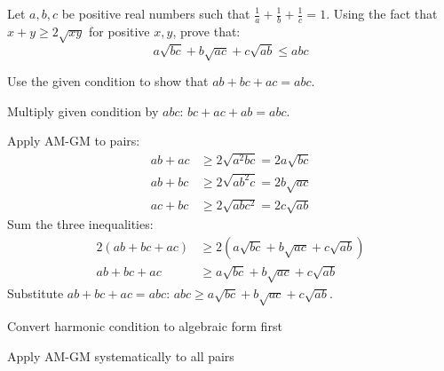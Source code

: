 \begin{problem}
Let $a, b, c$ be positive real numbers such that $\frac{1}{a} + \frac{1}{b} + \frac{1}{c} = 1$.
Using the fact that $x+y \ge 2\sqrt{xy}$ for positive $x, y$, prove that:
\[ a\sqrt{bc} + b\sqrt{ac} + c\sqrt{ab} \le abc \]
\end{problem}

\begin{hint}
Use the given condition to show that $ab + bc + ac = abc$.
\end{hint}

\begin{solution}
Multiply given condition by $abc$: $bc + ac + ab = abc$.

Apply AM-GM to pairs:
\begin{align*}
ab + ac &\ge 2\sqrt{a^2bc} = 2a\sqrt{bc}\\
ab + bc &\ge 2\sqrt{ab^2c} = 2b\sqrt{ac}\\
ac + bc &\ge 2\sqrt{abc^2} = 2c\sqrt{ab}
\end{align*}
Sum the three inequalities:
\begin{align*}
2(ab + bc + ac) &\ge 2(a\sqrt{bc} + b\sqrt{ac} + c\sqrt{ab})\\
ab + bc + ac &\ge a\sqrt{bc} + b\sqrt{ac} + c\sqrt{ab}
\end{align*}
Substitute $ab + bc + ac = abc$: $abc \ge a\sqrt{bc} + b\sqrt{ac} + c\sqrt{ab}$.
\end{solution}

\begin{takeaways}
\item Convert harmonic condition to algebraic form first
\item Apply AM-GM systematically to all pairs
\end{takeaways}
